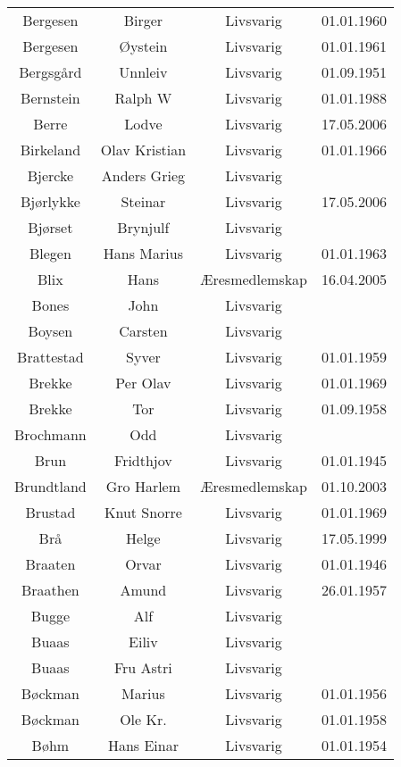 \begin{tabular}{cccc}
        Bergesen	&	Birger	&	Livsvarig 	&	01.01.1960	\\
        Bergesen	&	Øystein	&	Livsvarig 	&	01.01.1961	\\
        Bergsgård	&	Unnleiv	&	Livsvarig 	&	01.09.1951	\\
        Bernstein	&	Ralph W	&	Livsvarig 	&	01.01.1988	\\
        Berre	&	Lodve	&	Livsvarig	&	17.05.2006	\\
        Birkeland	&	Olav Kristian	&	Livsvarig 	&	01.01.1966	\\
        Bjercke	&	Anders Grieg	&	Livsvarig 	&		\\
        Bjørlykke	&	Steinar	&	Livsvarig	&	17.05.2006	\\
        Bjørset	&	Brynjulf	&	Livsvarig 	&		\\
        Blegen	&	Hans Marius	&	Livsvarig 	&	01.01.1963	\\
        Blix	&	Hans	&	Æresmedlemskap	&	16.04.2005	\\
        Bones	&	John	&	Livsvarig 	&		\\
        Boysen	&	Carsten	&	Livsvarig 	&		\\
        Brattestad	&	Syver	&	Livsvarig 	&	01.01.1959	\\
        Brekke	&	Per Olav	&	Livsvarig 	&	01.01.1969	\\
        Brekke	&	Tor	&	Livsvarig 	&	01.09.1958	\\
        Brochmann	&	Odd	&	Livsvarig 	&		\\
        Brun	&	Fridthjov	&	Livsvarig 	&	01.01.1945	\\
        Brundtland 	&	Gro Harlem 	&	Æresmedlemskap	&	01.10.2003	\\
        Brustad	&	Knut Snorre	&	Livsvarig 	&	01.01.1969	\\
        Brå 	&	Helge	&	Livsvarig	&	17.05.1999	\\
        Braaten	&	Orvar	&	Livsvarig 	&	01.01.1946	\\
        Braathen	&	Amund	&	Livsvarig 	&	26.01.1957	\\
        Bugge	&	Alf	&	Livsvarig 	&		\\
        Buaas	&	Eiliv	&	Livsvarig 	&		\\
        Buaas	&	Fru Astri	&	Livsvarig 	&		\\
        Bøckman	&	Marius	&	Livsvarig 	&	01.01.1956	\\
        Bøckman	&	Ole Kr. 	&	Livsvarig 	&	01.01.1958	\\
        Bøhm	&	Hans Einar	&	Livsvarig 	&	01.01.1954	\\

\end{tabular}
